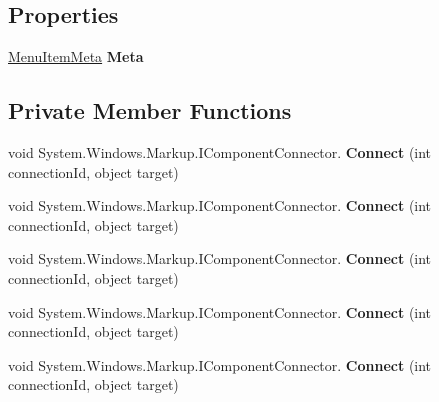 \subsection*{Properties}
\begin{DoxyCompactItemize}
\item 
\mbox{\hyperlink{class_uniform_client_1_1_plugins_1_1_menu_item_meta}{Menu\+Item\+Meta}} {\bfseries Meta}
\end{DoxyCompactItemize}
\subsection*{Private Member Functions}
\begin{DoxyCompactItemize}
\item 
\mbox{\label{class_teacher_handbook_1_1_plugins_1_1_schedule_1_1_schedule_a6b69e488632bb6650e94e68de0137da0}} 
void System.\+Windows.\+Markup.\+I\+Component\+Connector. {\bfseries Connect} (int connection\+Id, object target)
\item 
\mbox{\label{class_teacher_handbook_1_1_plugins_1_1_schedule_1_1_schedule_a6b69e488632bb6650e94e68de0137da0}} 
void System.\+Windows.\+Markup.\+I\+Component\+Connector. {\bfseries Connect} (int connection\+Id, object target)
\item 
\mbox{\label{class_teacher_handbook_1_1_plugins_1_1_schedule_1_1_schedule_a6b69e488632bb6650e94e68de0137da0}} 
void System.\+Windows.\+Markup.\+I\+Component\+Connector. {\bfseries Connect} (int connection\+Id, object target)
\item 
\mbox{\label{class_teacher_handbook_1_1_plugins_1_1_schedule_1_1_schedule_a6b69e488632bb6650e94e68de0137da0}} 
void System.\+Windows.\+Markup.\+I\+Component\+Connector. {\bfseries Connect} (int connection\+Id, object target)
\item 
\mbox{\label{class_teacher_handbook_1_1_plugins_1_1_schedule_1_1_schedule_a6b69e488632bb6650e94e68de0137da0}} 
void System.\+Windows.\+Markup.\+I\+Component\+Connector. {\bfseries Connect} (int connection\+Id, object target)
\end{DoxyCompactItemize}
